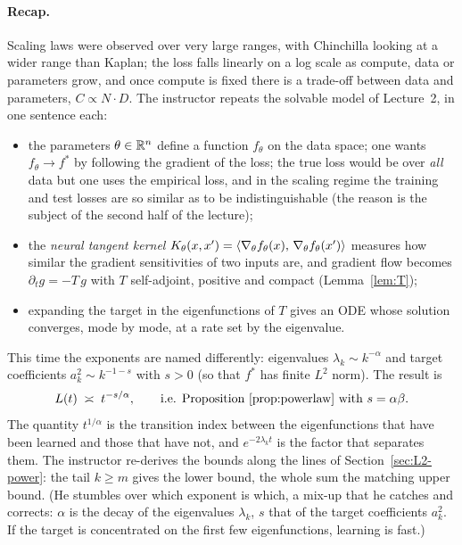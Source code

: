 \paragraph{Recap.}
Scaling laws were observed over very large ranges, with Chinchilla looking at a wider range than Kaplan; the loss falls linearly on a log scale as compute, data or parameters grow, and once compute is fixed there is a trade-off between data and parameters, $C\propto N\cdot D$. The instructor repeats the solvable model of Lecture~2, in one sentence each:
\begin{itemize}
  \item the parameters $\theta\in\mathbb{R}^n$ define a function $f_\theta$ on the data space; one wants $f_\theta\to f^*$ by following the gradient of the loss; the true loss would be over \emph{all} data but one uses the empirical loss, and in the scaling regime the training and test losses are so similar as to be indistinguishable (the reason is the subject of the second half of the lecture);
  \item the \emph{neural tangent kernel} $K_\theta(x,x')=\left\langle \nabla_\theta f_\theta(x),\,\nabla_\theta f_\theta(x')\right\rangle$ measures how similar the gradient sensitivities of two inputs are, and gradient flow becomes $\partial_tg=-T\,g$ with $T$ self-adjoint, positive and compact (Lemma~\ref{lem:T});
  \item expanding the target in the eigenfunctions of $T$ gives an ODE whose solution converges, mode by mode, at a rate set by the eigenvalue.
\end{itemize}
This time the exponents are named differently: eigenvalues $\lambda_k\sim k^{-\alpha}$ and target coefficients $a_k^2\sim k^{-1-s}$ with $s>0$ (so that $f^*$ has finite $L^2$ norm). The result is
\[
   L(t)\;\asymp\;t^{-s/\alpha},\qquad\text{i.e. Proposition~\ref{prop:powerlaw} with } s=\alpha\beta .
\]
The quantity $t^{1/\alpha}$ is the transition index between the eigenfunctions that have been learned and those that have not, and $e^{-2\lambda_kt}$ is the factor that separates them. The instructor re-derives the bounds along the lines of Section~\ref{sec:L2-power}: the tail $k\ge m$ gives the lower bound, the whole sum the matching upper bound. (He stumbles over which exponent is which, a mix-up that he catches and corrects: $\alpha$ is the decay of the eigenvalues $\lambda_k$, $s$ that of the target coefficients $a_k^2$. If the target is concentrated on the first few eigenfunctions, learning is fast.)

